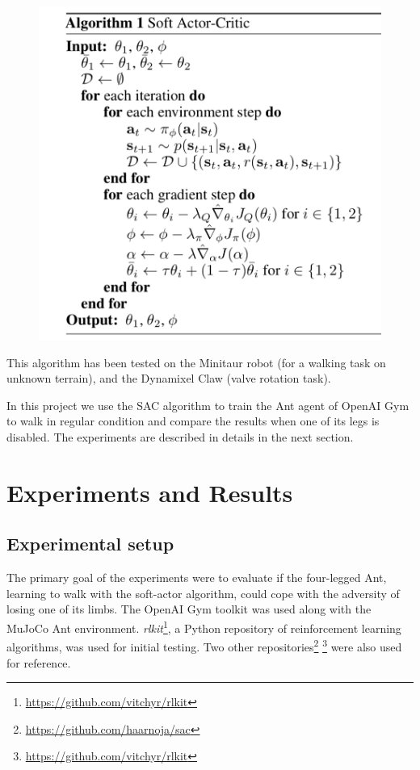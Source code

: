 \documentclass[conference]{IEEEtran}
\begin{document}
\begin{figure}[H]
\centering
\includegraphics[width=\linewidth]{img/figSACAlgo.png}
\end{figure}

This algorithm has been tested on the Minitaur robot (for a walking task on unknown terrain), and the Dynamixel Claw (valve rotation task).

In this project we use the SAC algorithm to train the Ant agent of OpenAI Gym to walk in regular condition and compare the results when one of its legs is disabled. The experiments are described in details in the next section.

\section{Experiments and Results}\label{secExp}
\subsection{Experimental setup}
The primary goal of the experiments were to evaluate if the four-legged Ant\cite{AntEnv}, learning to walk with the soft-actor algorithm, could cope with the adversity of losing one of its limbs. The OpenAI Gym \cite{openAIgym} toolkit was used along with the MuJoCo\cite{todorov2012mujoco} Ant environment. \textit{rlkit}\footnote{\url{https://github.com/vitchyr/rlkit}}, a Python repository of reinforcement learning algorithms, was used for initial testing. Two other repositories\footnote{\url{https://github.com/haarnoja/sac}} \footnote{\url{https://github.com/vitchyr/rlkit}} were also used for reference.
\end{document}
